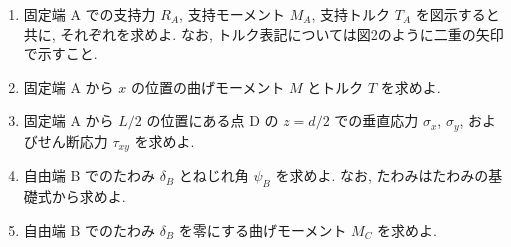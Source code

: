 \begin{enumerate}[label=(\arabic*)]
  \item 固定端 A での支持力 $R_A$, 支持モーメント $M_A$, 支持トルク $T_A$ を図示すると共に,
        それぞれを求めよ. なお, トルク表記については図2のように二重の矢印で示すこと.

  \item 固定端 A から $x$ の位置の曲げモーメント $M$ とトルク $T$ を求めよ.

  \item 固定端 A から $L/2$ の位置にある点 D の $z=d/2$ での垂直応力 $\sigma_x$, $\sigma_y$,
        およびせん断応力 $\tau_{xy}$ を求めよ.

  \item 自由端 B でのたわみ $\delta_B$ とねじれ角 $\psi_B$ を求めよ.
        なお, たわみはたわみの基礎式から求めよ.

  \item 自由端 B でのたわみ $\delta_B$ を零にする曲げモーメント $M_C$ を求めよ.
\end{enumerate}
